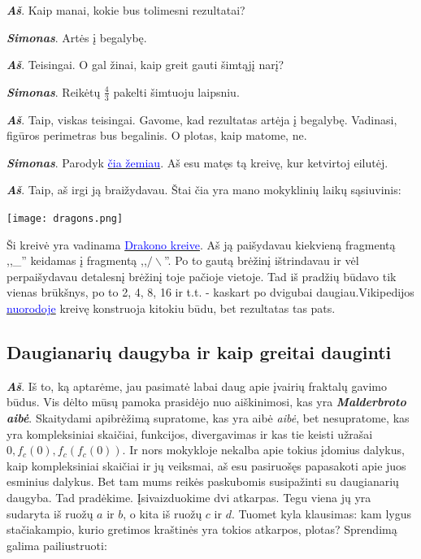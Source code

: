 \documentclass[a4paper]{article}
\newcommand{\goto}[2]{\href{\detokenize{#1}}{\textcolor{blue}{#2}}}
\newcommand{\say}[1]{\textbf{\textit{#1}}}
\begin{document}
\say{Aš}. Kaip manai, kokie bus tolimesni rezultatai?

\say{Simonas}. Artės į begalybę.

\say{Aš}. Teisingai. O gal žinai, kaip greit gauti šimtąjį narį?

\say{Simonas}. Reikėtų $\frac{4}{3}$ pakelti šimtuoju laipsniu.

\say{Aš}. Taip, viskas teisingai. Gavome, kad rezultatas artėja į begalybę. Vadinasi, figūros perimetras bus begalinis. O plotas, kaip matome, ne.

\say{Simonas}. Parodyk \href{https://en.wikipedia.org/wiki/Koch_snowflake\#Variants_of_the_Koch_curve}{\textcolor{blue}{čia žemiau}}. Aš esu matęs tą kreivę, kur ketvirtoj eilutėj.

\say{Aš}. Taip, aš irgi ją braižydavau. Štai čia yra mano mokyklinių laikų sąsiuvinis:

\texttt{[image: dragons.png]}

Ši kreivė yra vadinama \goto{https://en.wikipedia.org/wiki/Dragon_curve}{Drakono kreive}. Aš ją paišydavau kiekvieną fragmentą ,,\_'' keidamas į fragmentą ,,$/\backslash$''. Po to gautą brėžinį ištrindavau ir vėl perpaišydavau detalesnį brėžinį toje pačioje vietoje. Tad iš pradžių būdavo tik vienas brūkšnys, po to 2, 4, 8, 16 ir t.t. - kaskart po dvigubai daugiau.Vikipedijos \goto{https://en.wikipedia.org/wiki/Dragon_curve}{nuorodoje} kreivę konstruoja kitokiu būdu, bet rezultatas tas pats.

\subsection*{Daugianarių daugyba ir kaip greitai dauginti}

\say{Aš}. Iš to, ką aptarėme, jau pasimatė labai daug apie įvairių fraktalų gavimo būdus. Vis dėlto mūsų pamoka prasidėjo nuo aiškinimosi, kas yra \say{Malderbroto aibė}. Skaitydami apibrėžimą supratome, kas yra aibė \textit{aibė}, bet nesupratome, kas yra kompleksiniai skaičiai, funkcijos, divergavimas ir kas tie keisti užrašai $0,f_{c}(0), f_{c}(f_{c}(0))$. Ir nors mokykloje nekalba apie tokius įdomius dalykus, kaip kompleksiniai skaičiai ir jų veiksmai, aš esu pasiruošęs papasakoti apie juos esminius dalykus. Bet tam mums reikės paskubomis susipažinti su daugianarių daugyba. Tad pradėkime. Įsivaizduokime dvi atkarpas. Tegu viena jų yra sudaryta iš ruožų $a$ ir $b$, o kita iš ruožų $c$ ir $d$. Tuomet kyla klausimas: kam lygus stačiakampio, kurio gretimos kraštinės yra tokios atkarpos, plotas? Sprendimą galima pailiustruoti:
\end{document}
